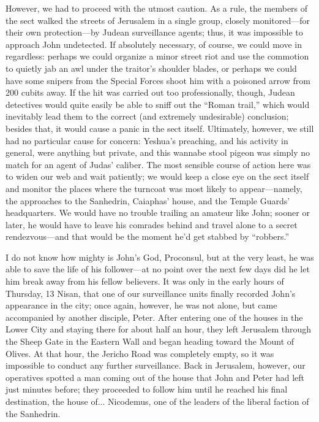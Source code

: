 However, we had to proceed with the utmost caution. As a rule, the members of the sect walked the streets of Jerusalem in a single group, closely monitored---for their own protection---by Judean surveillance agents; thus, it was impossible to approach John undetected. If absolutely necessary, of course, we could move in regardless: perhaps we could organize a minor street riot and use the commotion to quietly jab an awl under the traitor's shoulder blades, or perhaps we could have some snipers from the Special Forces shoot him with a poisoned arrow from 200 cubits away. If the hit was carried out too professionally, though, Judean detectives would quite easily be able to sniff out the ``Roman trail,'' which would inevitably lead them to the correct (and extremely undesirable) conclusion; besides that, it would cause a panic in the sect itself. Ultimately, however, we still had no particular cause for concern: Yeshua's preaching, and his activity in general, were anything but private, and this wannabe stool pigeon was simply no match for an agent of Judas' caliber. The most sensible course of action here was to widen our web and wait patiently; we would keep a close eye on the sect itself and monitor the places where the turncoat was most likely to appear---namely, the approaches to the Sanhedrin, Caiaphas' house, and the Temple Guards' headquarters. We would have no trouble trailing an amateur like John; sooner or later, he would have to leave his comrades behind and travel alone to a secret rendezvous---and that would be the moment he'd get stabbed by ``robbers.''

I do not know how mighty is John's God, Proconsul, but at the very least, he was able to save the life of his follower---at no point over the next few days did he let him break away from his fellow believers. It was only in the early hours of Thursday, 13 Nisan, that one of our surveillance units finally recorded John's appearance in the city; once again, however, he was not alone, but came accompanied by another disciple, Peter. After entering one of the houses in the Lower City and staying there for about half an hour, they left Jerusalem through the Sheep Gate in the Eastern Wall and began heading toward the Mount of Olives. At that hour, the Jericho Road was completely empty, so it was impossible to conduct any further surveillance. Back in Jerusalem, however, our operatives spotted a man coming out of the house that John and Peter had left just minutes before; they proceeded to follow him until he reached his final destination, the house of... Nicodemus, one of the leaders of the liberal faction of the Sanhedrin.

